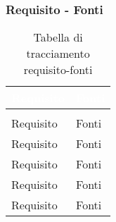 \subsubsection{Requisito - Fonti}
\renewcommand{\arraystretch}{1.5}
\begin{center}
\begin{longtable}{C{6cm} C{6cm}}
		\textcolor{white}{\textbf{Requisito}} & 
		\textcolor{white}{\textbf{Fonti}}\\
		\endfirsthead
	    \\
	    \endfoot
	    \caption{Tabella di tracciamento requisito-fonti}
	    \endlastfoot

Requisito & Fonti \\
Requisito & Fonti \\
Requisito & Fonti \\
Requisito & Fonti \\
Requisito & Fonti \\
\end{longtable}
\end{center}